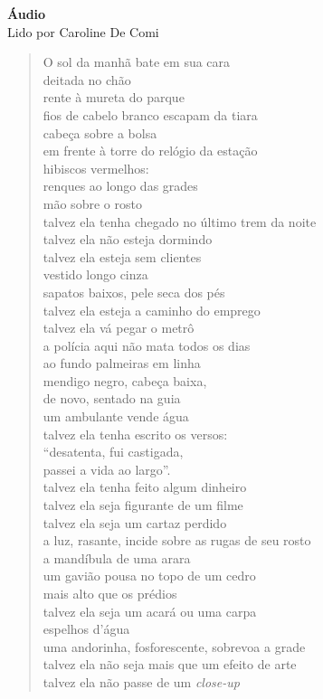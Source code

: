 \pagebreak

\textbf{Áudio}\\
Lido por Caroline De Comi

\begin{verse}
O sol da manhã bate em sua cara\\
deitada no chão\\
rente à mureta do parque\\
fios de cabelo branco escapam da tiara\\[5pt]
cabeça sobre a bolsa\\
em frente à torre do relógio da estação\\
hibiscos vermelhos:\\
renques ao longo das grades\\[5pt]
mão sobre o rosto\\
talvez ela tenha chegado no último trem da noite\\
talvez ela não esteja dormindo\\
talvez ela esteja sem clientes\\[5pt]
vestido longo cinza\\
sapatos baixos, pele seca dos pés\\
talvez ela esteja a caminho do emprego\\
talvez ela vá pegar o metrô\\[5pt]
a polícia aqui não mata todos os dias\\
ao fundo palmeiras em linha\\
mendigo negro, cabeça baixa,\\
de novo, sentado na guia\\[5pt]
um ambulante vende água\\
talvez ela tenha escrito os versos:\\
``desatenta, fui castigada,\\
passei a vida ao largo''.\\[5pt]
talvez ela tenha feito algum dinheiro\\
talvez ela seja figurante de um filme\\
talvez ela seja um cartaz perdido\\
a luz, rasante, incide sobre as rugas de seu rosto\\[5pt]
a mandíbula de uma arara\\
um gavião pousa no topo de um cedro\\
mais alto que os prédios\\
talvez ela seja um acará ou uma carpa\\[5pt]
espelhos d'água\\
uma andorinha, fosforescente, sobrevoa a grade\\
talvez ela não seja mais que um efeito de arte\\
talvez ela não passe de um \emph{close-up}
\end{verse}

